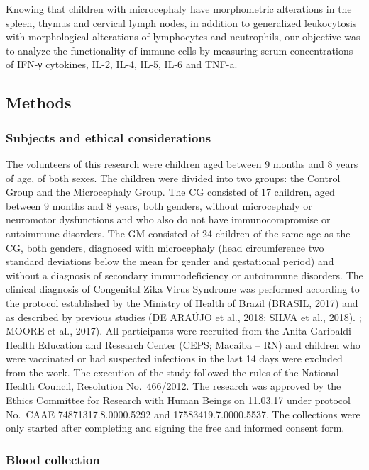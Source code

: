 \documentclass[
]{article}
\begin{document}
Knowing that children with microcephaly have morphometric alterations in
the spleen, thymus and cervical lymph nodes, in addition to generalized
leukocytosis with morphological alterations of lymphocytes and
neutrophils, our objective was to analyze the functionality of immune
cells by measuring serum concentrations of IFN-γ cytokines, IL-2, IL-4,
IL-5, IL-6 and TNF-a.

\hypertarget{methods}{%
\subsection{Methods}\label{methods}}

\hypertarget{subjects-and-ethical-considerations}{%
\subsubsection{Subjects and ethical
considerations}\label{subjects-and-ethical-considerations}}

The volunteers of this research were children aged between 9 months and
8 years of age, of both sexes. The children were divided into two
groups: the Control Group and the Microcephaly Group. The CG consisted
of 17 children, aged between 9 months and 8 years, both genders, without
microcephaly or neuromotor dysfunctions and who also do not have
immunocompromise or autoimmune disorders. The GM consisted of 24
children of the same age as the CG, both genders, diagnosed with
microcephaly (head circumference two standard deviations below the mean
for gender and gestational period) and without a diagnosis of secondary
immunodeficiency or autoimmune disorders. The clinical diagnosis of
Congenital Zika Virus Syndrome was performed according to the protocol
established by the Ministry of Health of Brazil (BRASIL, 2017) and as
described by previous studies (DE ARAÚJO et al., 2018; SILVA et al.,
2018). ; MOORE et al., 2017). All participants were recruited from the
Anita Garibaldi Health Education and Research Center (CEPS; Macaíba --
RN) and children who were vaccinated or had suspected infections in the
last 14 days were excluded from the work. The execution of the study
followed the rules of the National Health Council, Resolution
No.~466/2012. The research was approved by the Ethics Committee for
Research with Human Beings on 11.03.17 under protocol No.~CAAE
74871317.8.0000.5292 and 17583419.7.0000.5537. The collections were only
started after completing and signing the free and informed consent form.

\hypertarget{blood-collection}{%
\subsubsection{Blood collection}\label{blood-collection}}
\end{document}
